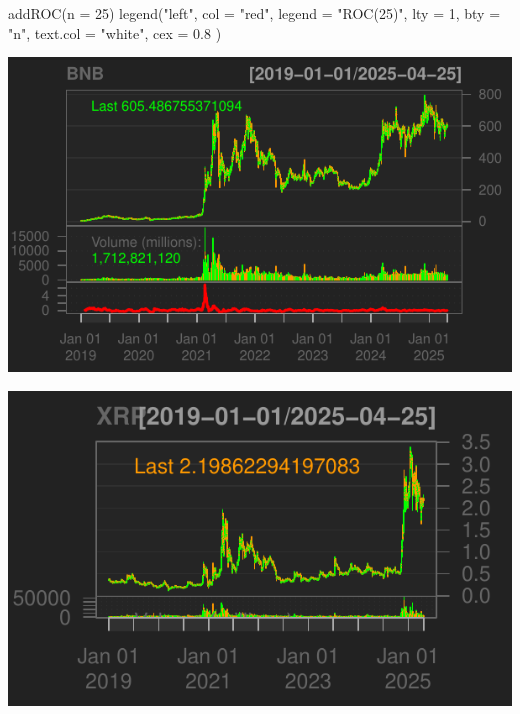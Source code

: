 \documentclass[]{tufte-handout}
\newenvironment{Shaded}{}{}
\newcommand{\AttributeTok}[1]{\textcolor[rgb]{0.49,0.56,0.16}{#1}}
\newcommand{\DecValTok}[1]{\textcolor[rgb]{0.25,0.63,0.44}{#1}}
\newcommand{\FloatTok}[1]{\textcolor[rgb]{0.25,0.63,0.44}{#1}}
\newcommand{\FunctionTok}[1]{\textcolor[rgb]{0.02,0.16,0.49}{#1}}
\newcommand{\NormalTok}[1]{#1}
\newcommand{\OtherTok}[1]{\textcolor[rgb]{0.00,0.44,0.13}{#1}}
\newcommand{\SpecialCharTok}[1]{\textcolor[rgb]{0.25,0.44,0.63}{#1}}
\newcommand{\StringTok}[1]{\textcolor[rgb]{0.25,0.44,0.63}{#1}}
\begin{document}
\begin{Shaded}
\begin{Highlighting}[]
\FunctionTok{addROC}\NormalTok{(}\AttributeTok{n =} \DecValTok{25}\NormalTok{)}
\FunctionTok{legend}\NormalTok{(}\StringTok{"left"}\NormalTok{,}
  \AttributeTok{col =} \StringTok{"red"}\NormalTok{, }\AttributeTok{legend =} \StringTok{"ROC(25)"}\NormalTok{, }\AttributeTok{lty =} \DecValTok{1}\NormalTok{, }\AttributeTok{bty =} \StringTok{"n"}\NormalTok{,}
  \AttributeTok{text.col =} \StringTok{"white"}\NormalTok{, }\AttributeTok{cex =} \FloatTok{0.8}
\NormalTok{)}
\end{Highlighting}
\end{Shaded}

\includegraphics{cripto_update_files/figure-latex/unnamed-chunk-12-6}

\begin{Shaded}
\end{Shaded}

\includegraphics{cripto_update_files/figure-latex/unnamed-chunk-12-7}
\end{document}
